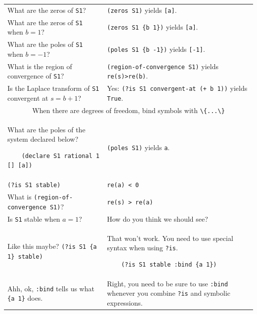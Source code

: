 \documentclass[11pt,letter]{article}
\begin{document}
\begin{longtable}{ p{} p{} }
  What are the zeros of \lstinline!S1!?
  &
  \lstinline!(zeros S1)! yields \lstinline![a]!. \\

  What are the zeros of \lstinline!S1! when $b=1$?
  &
  \lstinline!(zeros S1 {b 1})! yields \lstinline![a]!. \\

  What are the poles of \lstinline!S1! when $b=-1$?
  &
  \lstinline!(poles S1 {b -1})! yields \lstinline![-1]!. \\

  What is the region of convergence of \lstinline!S1!?
  &
  \lstinline!(region-of-convergence S1)! yields \lstinline!re(s)>re(b)!. \\

  Is the Laplace transform of \lstinline!S1! convergent at $s=b+1$?
  &
  Yes: \lstinline!(?is S1 convergent-at (+ b 1))! yields \lstinline!True!. \\

  \midrule

  \multicolumn{2}{c}{\Large When there are degrees of freedom, bind symbols with \lstinline!\{...\}!} \\

  \midrule

  What are the poles of the system declared below?
  \begin{lstlisting}
    (declare S1 rational 1 [] [a])
  \end{lstlisting}
  &
  \lstinline!(poles S1)! yields \lstinline!a!. \\

  \lstinline!(?is S1 stable)!
  &
  \lstinline!re(a) < 0!
  \\

  What is \lstinline!(region-of-convergence S1)!?
  &
  \lstinline!re(s) > re(a)!
  \\

  Is \lstinline!S1! stable when $a=1$?
  &
  How do you think we should see? \\

  Like this maybe? \lstinline!(?is S1 {a 1} stable)!
  &
  That won't work. You need to use special syntax when using \lstinline!?is!.
  \begin{lstlisting}
    (?is S1 stable :bind {a 1})
  \end{lstlisting} \\

  Ahh, ok, \lstinline!:bind! tells us what \lstinline!{a 1}! does.
  &
  Right, you need to be sure to use \lstinline!:bind! whenever you combine \lstinline!?is! and symbolic expressions. \\


\end{longtable}
\end{document}
